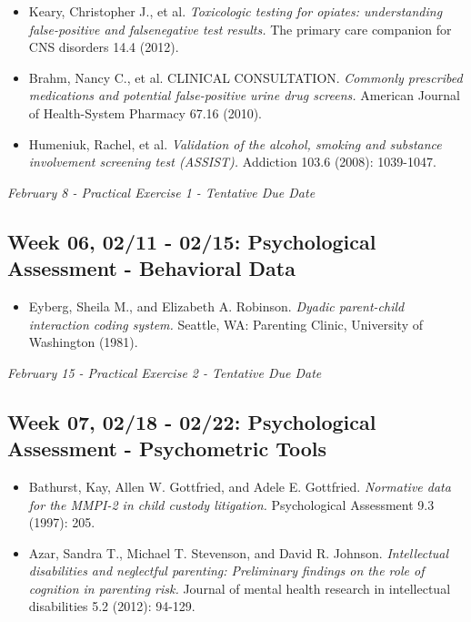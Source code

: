 \documentclass[11pt,]{article}
\providecommand{\tightlist}{%
  \setlength{\itemsep}{0pt}\setlength{\parskip}{0pt}}
\begin{document}
\begin{itemize}
\item
  Keary, Christopher J., et al. \emph{Toxicologic testing for opiates:
  understanding false-positive and falsenegative test results.} The
  primary care companion for CNS disorders 14.4 (2012).
\item
  Brahm, Nancy C., et al. CLINICAL CONSULTATION. \emph{Commonly
  prescribed medications and potential false-positive urine drug
  screens.} American Journal of Health-System Pharmacy 67.16 (2010).
\item
  Humeniuk, Rachel, et al. \emph{Validation of the alcohol, smoking and
  substance involvement screening test (ASSIST).} Addiction 103.6
  (2008): 1039-1047.
\end{itemize}

\emph{February 8 - Practical Exercise 1 - Tentative Due Date}

\subsection{Week 06, 02/11 - 02/15: Psychological Assessment -
Behavioral
Data}\label{week-06-0211---0215-psychological-assessment---behavioral-data}

\begin{itemize}
\tightlist
\item
  Eyberg, Sheila M., and Elizabeth A. Robinson. \emph{Dyadic
  parent-child interaction coding system.} Seattle, WA: Parenting
  Clinic, University of Washington (1981).
\end{itemize}

\emph{February 15 - Practical Exercise 2 - Tentative Due Date}

\subsection{Week 07, 02/18 - 02/22: Psychological Assessment -
Psychometric
Tools}\label{week-07-0218---0222-psychological-assessment---psychometric-tools}

\begin{itemize}
\item
  Bathurst, Kay, Allen W. Gottfried, and Adele E. Gottfried.
  \emph{Normative data for the MMPI-2 in child custody litigation.}
  Psychological Assessment 9.3 (1997): 205.
\item
  Azar, Sandra T., Michael T. Stevenson, and David R. Johnson.
  \emph{Intellectual disabilities and neglectful parenting: Preliminary
  findings on the role of cognition in parenting risk.} Journal of
  mental health research in intellectual disabilities 5.2 (2012):
  94-129.
\end{itemize}
\end{document}
